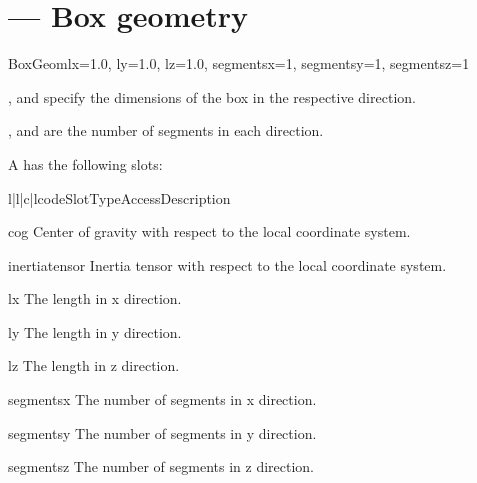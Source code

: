 
\section{ ---
         Box geometry}

\begin{classdesc}{BoxGeom}{lx=1.0, ly=1.0, lz=1.0, segmentsx=1, segmentsy=1, segmentsz=1}

,  and  specify the dimensions of the box in
the respective direction.

,  and  are the number of
segments in each direction.
\end{classdesc}

A  has the following slots:

\begin{tableiv}{l|l|c|l}{code}{Slot}{Type}{Access}{Description}
\end{tableiv}

\begin{memberdesc}{cog}
Center of gravity with respect to the local coordinate system.
\end{memberdesc}

\begin{memberdesc}{inertiatensor}
Inertia tensor with respect to the local coordinate system.
\end{memberdesc}

\begin{memberdesc}{lx}
The length in x direction.
\end{memberdesc}

\begin{memberdesc}{ly}
The length in y direction.
\end{memberdesc}

\begin{memberdesc}{lz}
The length in z direction.
\end{memberdesc}

\begin{memberdesc}{segmentsx}
The number of segments in x direction.
\end{memberdesc}

\begin{memberdesc}{segmentsy}
The number of segments in y direction.
\end{memberdesc}

\begin{memberdesc}{segmentsz}
The number of segments in z direction.
\end{memberdesc}








